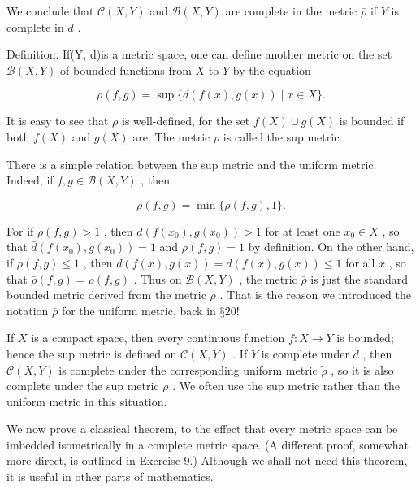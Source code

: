We conclude that \(\mathcal{C}\left( {X,Y}\right)\) and \(\mathcal{B}\left( {X,Y}\right)\) are complete in the metric \(\bar{\rho }\) if \(Y\) is complete in \(d\) .

Definition. If(Y, d)is a metric space, one can define another metric on the set \(\mathcal{B}\left( {X,Y}\right)\) of bounded functions from \(X\) to \(Y\) by the equation

\[
\rho \left( {f,g}\right)  = \sup \{ d\left( {f\left( x\right) ,g\left( x\right) }\right)  \mid  x \in  X\} .
\]

It is easy to see that \(\rho\) is well-defined, for the set \(f\left( X\right)  \cup  g\left( X\right)\) is bounded if both \(f\left( X\right)\) and \(g\left( X\right)\) are. The metric \(\rho\) is called the sup metric.

There is a simple relation between the sup metric and the uniform metric. Indeed, if \(f,g \in  \mathcal{B}\left( {X,Y}\right)\) , then

\[
\bar{\rho }\left( {f,g}\right)  = \min \{ \rho \left( {f,g}\right) ,1\} .
\]

For if \(\rho \left( {f,g}\right)  > 1\) , then \(d\left( {f\left( {x}_{0}\right) ,g\left( {x}_{0}\right) }\right)  > 1\) for at least one \({x}_{0} \in  X\) , so that \(\bar{d}\left( {f\left( {x}_{0}\right) ,g\left( {x}_{0}\right) }\right)  = 1\) and \(\bar{\rho }\left( {f,g}\right)  = 1\) by definition. On the other hand, if \(\rho \left( {f,g}\right)  \leq  1\) , then \(d\left( {f\left( x\right) ,g\left( x\right) }\right)  = d\left( {f\left( x\right) ,g\left( x\right) }\right)  \leq  1\) for all \(x\) , so that \(\bar{\rho }\left( {f,g}\right)  = \rho \left( {f,g}\right)\) . Thus on \(\mathcal{B}\left( {X,Y}\right)\) , the metric \(\bar{\rho }\) is just the standard bounded metric derived from the metric \(\rho\) . That is the reason we introduced the notation \(\bar{\rho }\) for the uniform metric, back in \(§{20}!\)

If \(X\) is a compact space, then every continuous function \(f : X \rightarrow  Y\) is bounded; hence the sup metric is defined on \(\mathcal{C}\left( {X,Y}\right)\) . If \(Y\) is complete under \(d\) , then \(\mathcal{C}\left( {X,Y}\right)\) is complete under the corresponding uniform metric \(\widetilde{\rho }\) , so it is also complete under the sup metric \(\rho\) . We often use the sup metric rather than the uniform metric in this situation.

We now prove a classical theorem, to the effect that every metric space can be imbedded isometrically in a complete metric space. (A different proof, somewhat more direct, is outlined in Exercise 9.) Although we shall not need this theorem, it is useful in other parts of mathematics.

